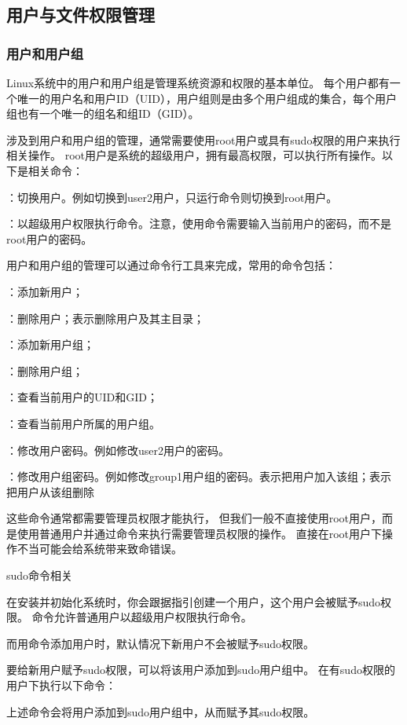 \subsection{用户与文件权限管理}
\subsubsection{用户和用户组}
Linux系统中的用户和用户组是管理系统资源和权限的基本单位。
每个用户都有一个唯一的用户名和用户ID（UID），用户组则是由多个用户组成的集合，每个用户组也有一个唯一的组名和组ID（GID）。

涉及到用户和用户组的管理，通常需要使用root用户或具有sudo权限的用户来执行相关操作。
root用户是系统的超级用户，拥有最高权限，可以执行所有操作。以下是相关命令：

：切换用户。例如切换到user2用户，只运行命令则切换到root用户。

：以超级用户权限执行命令。注意，使用命令需要输入当前用户的密码，而不是root用户的密码。

用户和用户组的管理可以通过命令行工具来完成，常用的命令包括：

：添加新用户；

：删除用户；表示删除用户及其主目录；

：添加新用户组；

：删除用户组；

：查看当前用户的UID和GID；

：查看当前用户所属的用户组。

：修改用户密码。例如修改user2用户的密码。

：修改用户组密码。例如修改group1用户组的密码。表示把用户加入该组；表示把用户从该组删除

这些命令通常都需要管理员权限才能执行，
但我们一般不直接使用root用户，而是使用普通用户并通过命令来执行需要管理员权限的操作。
直接在root用户下操作不当可能会给系统带来致命错误。

\begin{zy}
sudo命令相关

在安装并初始化系统时，你会跟据指引创建一个用户，这个用户会被赋予sudo权限。
命令允许普通用户以超级用户权限执行命令。

而用命令添加用户时，默认情况下新用户不会被赋予sudo权限。

要给新用户赋予sudo权限，可以将该用户添加到sudo用户组中。
在有sudo权限的用户下执行以下命令：
上述命令会将用户添加到sudo用户组中，从而赋予其sudo权限。
\end{zy}

